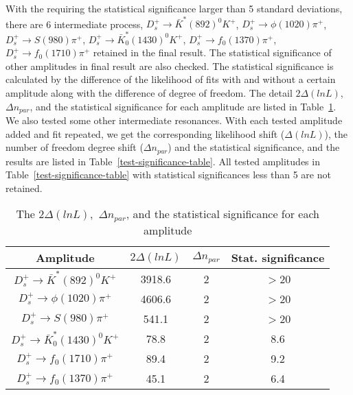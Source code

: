 {With the requiring the statistical significance larger than 5 standard deviations, there are 6 intermediate process, 
$D_{s}^{+} \rightarrow \bar{K}^{*}(892)^{0}K^{+}$,
$D_{s}^{+} \rightarrow \phi(1020)\pi^{+}$,
$D_{s}^{+} \rightarrow S(980)\pi^{+}$,
$D_{s}^{+} \rightarrow \bar{K}^{*}_{0}(1430)^{0}K^{+}$,
$D_{s}^{+} \rightarrow f_{0}(1370)\pi^{+}$,
$D_{s}^{+} \rightarrow f_{0}(1710)\pi^{+}$ 
retained in the final result. The statistical significance of other amplitudes in final result are also checked.
The statistical significance is calculated by the difference of the likelihood of fits with and without a certain amplitude along with the difference of degree of freedom.
The detail $2\Delta(lnL)$, $\Delta n_{par}$, and the statistical significance for each amplitude are  listed in Table~\ref{significance-table}.
We also tested some other intermediate resonances. With each tested amplitude added and fit repeated, we get the corresponding likelihood shift ($\Delta(lnL)$), the number of freedom degree shift ($\Delta n_{par}$) and the statistical significance, and the results are listed in Table~\ref{test-significance-table}.
All tested amplitudes in Table~\ref{test-significance-table}  with statistical significances less than 5 are not retained. 
\begin{table}[htbp]
    \caption{The $2\Delta(lnL)$,~$\Delta n_{par}$, and the statistical significance for each amplitude}
    \label{significance-table}
    \begin{center}
        \begin{tabular}{cccc}
            \toprule
            Amplitude & $2\Delta(lnL)$ & $\Delta n_{par}$ & Stat. significance\\
            \hline
            $D_{s}^{+} \rightarrow \bar{K}^{*}(892)^{0}K^{+}$              & 3918.6     & 2   & $>$20\\
            $D_{s}^{+} \rightarrow \phi(1020)\pi^{+}$                      & 4606.6     & 2   & $>$20\\
            $D_{s}^{+} \rightarrow S(980)\pi^{+}$                           & 541.1      & 2   & $>$20\\
            $D_{s}^{+} \rightarrow \bar{K}^{*}_{0}(1430)^{0}K^{+}$         & 78.8       & 2   & 8.6\\
            $D_{s}^{+} \rightarrow f_{0}(1710)\pi^{+}$                     & 89.4       & 2   & 9.2\\
            $D_{s}^{+} \rightarrow f_{0}(1370)\pi^{+}$                     & 45.1       & 2   & 6.4\\
            \bottomrule
        \end{tabular}
    \end{center}
\end{table}

}
